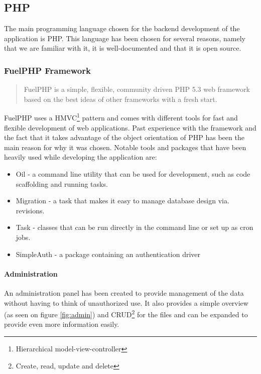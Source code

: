 \subsection{PHP}
\label{sec:php}
The main programming language chosen for the backend development of the application is PHP. This language has been chosen for several reasons, namely that we are familiar with it, it is well-documented and that it is open source.

\subsubsection{FuelPHP Framework}
\label{sec:fuelphp_framework}
\begin{quote}
FuelPHP is a simple, flexible, community driven PHP 5.3 web framework based on the best ideas of other frameworks with a fresh start\cite{FuelPHP}.
\end{quote}

FuelPHP uses a HMVC\footnote{Hierarchical model-view-controller} pattern and comes with different tools for fast and flexible development of web applications. Past experience with the framework and the fact that it takes advantage of the object orientation of PHP has been the main reason for why it was chosen. Notable tools and packages that have been heavily used while developing the application are:

\begin{itemize}
\item Oil - a command line utility that can be used for development, such as code scaffolding and running tasks. 
\item Migration - a task that makes it easy to manage database design via. revisions.
\item Task - classes that can be run directly in the command line or set up as cron jobs.
\item SimpleAuth - a package containing an authentication driver
\end{itemize}

\paragraph{Administration}
\label{sec:administration}
An administration panel has been created to provide management of the data without having to think of unauthorized use. It also provides a simple overview (as seen on figure \ref{fig:admin}) and CRUD\footnote{Create, read, update and delete} for the \textsf{files} and can be expanded to provide even more information easily.

